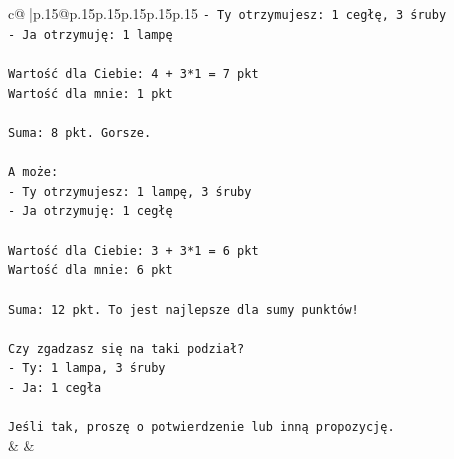 \documentclass{article}
\begin{document}
{\begin{supertabular}{c@{$\;$}|p{.15\linewidth}@{}p{.15\linewidth}p{.15\linewidth}p{.15\linewidth}p{.15\linewidth}p{.15\linewidth}}
{{{\texttt{{-} Ty otrzymujesz: 1 cegłę, 3 śruby} \\
\texttt{{-} Ja otrzymuję: 1 lampę} \\
\\ 
\texttt{Wartość dla Ciebie: 4 + 3*1 = 7 pkt} \\
\texttt{Wartość dla mnie: 1 pkt} \\
\\ 
\texttt{Suma: 8 pkt. Gorsze.} \\
\\ 
\texttt{A może:} \\
\texttt{{-} Ty otrzymujesz: 1 lampę, 3 śruby} \\
\texttt{{-} Ja otrzymuję: 1 cegłę} \\
\\ 
\texttt{Wartość dla Ciebie: 3 + 3*1 = 6 pkt} \\
\texttt{Wartość dla mnie: 6 pkt} \\
\\ 
\texttt{Suma: 12 pkt. To jest najlepsze dla sumy punktów!} \\
\\ 
\texttt{Czy zgadzasz się na taki podział?} \\
\texttt{{-} Ty: 1 lampa, 3 śruby} \\
\texttt{{-} Ja: 1 cegła} \\
\\ 
\texttt{Jeśli tak, proszę o potwierdzenie lub inną propozycję.} \\
            }
        }
    }
    & & \\ \\


\end{supertabular}}
\end{document}
